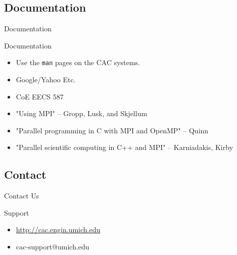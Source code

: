 \documentclass{beamer}
\begin{document}
\subsection{Documentation}
\begin{frame}{Documentation}
\begin{block}{Documentation}
 \begin{itemize}
  \item Use the \texttt{man} pages on the CAC systems.
  \item Google/Yahoo Etc.
  \item CoE EECS 587
  \item "Using MPI" -- Gropp, Lusk, and Skjellum  
  \item "Parallel programming in C with MPI and OpenMP" -- Quinn
  \item "Parallel scientific computing in C++ and MPI" -- Karniadakis, Kirby
 \end{itemize}
\end{block}

\end{frame}

\subsection{Contact}
\begin{frame}{Contact Us}
 \begin{block}{Support}
  \begin{itemize}
   \item \url{http://cac.engin.umich.edu}
   \item cac-support@umich.edu
  \end{itemize}
 \end{block}
\end{frame}
\end{document}
